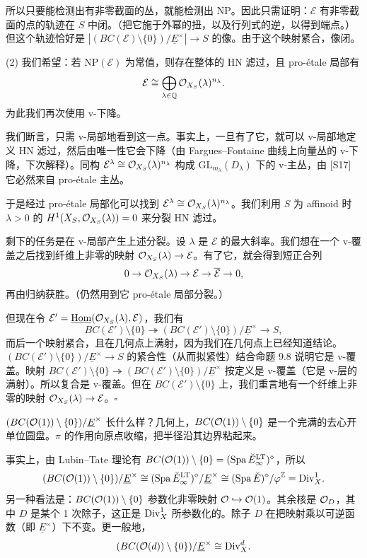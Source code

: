 所以只要能检测出有非零截面的丛，就能检测出 NP。因此只需证明：$\mathcal{E}$ 有非零截面的点的轨迹在 $S$ 中闭。（把它施于外幂的扭，以及行列式的逆，以得到端点。）但这个轨迹恰好是 $|(BC(\mathcal{E})\setminus\{0\})/\underline{E}^\times|\to S$ 的像。由于这个映射紧合，像闭。

(2) 我们希望：若 $\mathrm{NP}(\mathcal{E})$ 为常值，则存在整体的 HN 滤过，且 pro-étale 局部有
\[
\mathcal{E}\cong\bigoplus_{\lambda\in\mathbb{Q}}\mathcal{O}_{X_S}(\lambda)^{n_\lambda}.
\]
为此我们再次使用 v-下降。

我们断言，只需 v-局部地看到这一点。事实上，一旦有了它，就可以 v-局部地定义 HN 滤过，然后由唯一性它会下降（由 Fargues--Fontaine 曲线上向量丛的 v-下降，下次解释）。同构 $\mathcal{E}^\lambda\cong\mathcal{O}_{X_S}(\lambda)^{n_\lambda}$ 构成 $\mathrm{GL}_{m_\lambda}(D_\lambda)$ 下的 v-主丛，由 [S17] 它必然来自 pro-étale 主丛。


于是经过 pro-étale 局部化可以找到 $\mathcal{E}^\lambda\cong\mathcal{O}_{X_S}(\lambda)^{n_\lambda}$。我们利用 $S$ 为 affinoid 时 $\lambda>0$ 的 $H^1(X_S,\mathcal{O}_{X_S}(\lambda))=0$ 来分裂 HN 滤过。

剩下的任务是在 v-局部产生上述分裂。设 $\lambda$ 是 $\mathcal{E}$ 的最大斜率。我们想在一个 v-覆盖之后找到纤维上非零的映射 $\mathcal{O}_{X_S}(\lambda)\to\mathcal{E}$。有了它，就会得到短正合列
\[
0\to\mathcal{O}_{X_S}(\lambda)\to\mathcal{E}\to\overline{\mathcal{E}}\to0,
\]
再由归纳获胜。（仍然用到它 pro-étale 局部分裂。）

但现在令 $\mathcal{E}'=\underline{\operatorname{Hom}}(\mathcal{O}_{X_S}(\lambda),\mathcal{E})$，我们有
\[
BC(\mathcal{E}')\setminus\{0\}\twoheadrightarrow
(BC(\mathcal{E}')\setminus\{0\})/\underline{E}^\times\to S,
\]
而后一个映射紧合，且在几何点上满射，因为我们在几何点上已经知道结论。$(BC(\mathcal{E}')\setminus\{0\})/\underline{E}^\times\to S$ 的紧合性（从而拟紧性）结合命题 9.8 说明它是 v-覆盖。映射 $BC(\mathcal{E}')\setminus\{0\}\twoheadrightarrow(BC(\mathcal{E}')\setminus\{0\})/\underline{E}^\times$ 按定义是 v-覆盖（它是 v-层的满射）。所以复合是 v-覆盖。但在 $BC(\mathcal{E}')\setminus\{0\}$ 上，我们重言地有一个纤维上非零的映射 $\mathcal{O}_{X_S}(\lambda)\to\mathcal{E}$。\hfill$\square$

\begin{example}
$(BC(\mathcal{O}(1))\setminus\{0\})/\underline{E}^\times$ 长什么样？几何上，$BC(\mathcal{O}(1))\setminus\{0\}$ 是一个完满的去心开单位圆盘。$\pi$ 的作用向原点收缩，把半径沿其边界粘起来。

事实上，由 Lubin--Tate 理论有 $BC(\mathcal{O}(1))\setminus\{0\}=(\operatorname{Spa}\breve E^{\mathrm{LT}}_\infty)^\diamond$，所以
\[
(BC(\mathcal{O}(1))\setminus\{0\})/\underline{E}^\times
\cong(\operatorname{Spa}\breve E^{\mathrm{LT}}_\infty)^\diamond/\underline{E}^\times
\cong(\operatorname{Spa}\breve E)^\diamond/\varphi^{\mathbb{Z}}
=\mathrm{Div}^1_X.
\]
另一种看法是：$BC(\mathcal{O}(1))\setminus\{0\}$ 参数化非零映射 $\mathcal{O}\hookrightarrow\mathcal{O}(1)$。其余核是 $\mathcal{O}_D$，其中 $D$ 是某个 1 次除子，这正是 $\mathrm{Div}^1_X$ 所参数化的。除子 $D$ 在把映射乘以可逆函数（即 $\underline{E}^\times$）下不变。更一般地，
\[
(BC(\mathcal{O}(d))\setminus\{0\})/\underline{E}^\times\cong\mathrm{Div}^d_X.
\]
\end{example}
